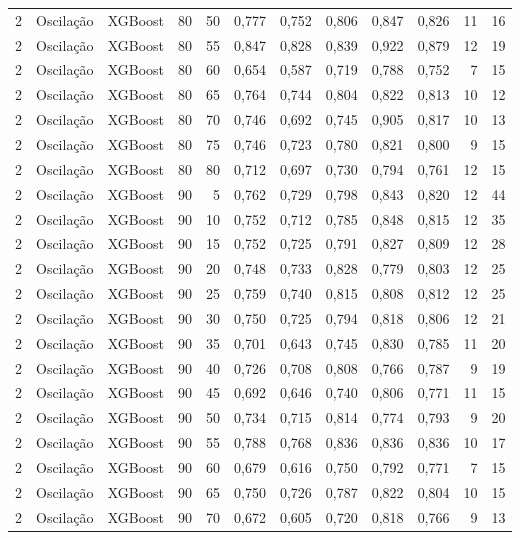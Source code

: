 \begin{longtable}{@{}rllrrrrrrrrr@{}}
2 & Oscilação & XGBoost & 80 & 50 & 0,777 & 0,752 & 0,806 & 0,847 & 0,826 & 11 & 16 \\
2 & Oscilação & XGBoost & 80 & 55 & 0,847 & 0,828 & 0,839 & 0,922 & 0,879 & 12 & 19 \\
2 & Oscilação & XGBoost & 80 & 60 & 0,654 & 0,587 & 0,719 & 0,788 & 0,752 & 7 & 15 \\
2 & Oscilação & XGBoost & 80 & 65 & 0,764 & 0,744 & 0,804 & 0,822 & 0,813 & 10 & 12 \\
2 & Oscilação & XGBoost & 80 & 70 & 0,746 & 0,692 & 0,745 & 0,905 & 0,817 & 10 & 13 \\
2 & Oscilação & XGBoost & 80 & 75 & 0,746 & 0,723 & 0,780 & 0,821 & 0,800 & 9 & 15 \\
2 & Oscilação & XGBoost & 80 & 80 & 0,712 & 0,697 & 0,730 & 0,794 & 0,761 & 12 & 15 \\
2 & Oscilação & XGBoost & 90 & 5 & 0,762 & 0,729 & 0,798 & 0,843 & 0,820 & 12 & 44 \\
2 & Oscilação & XGBoost & 90 & 10 & 0,752 & 0,712 & 0,785 & 0,848 & 0,815 & 12 & 35 \\
2 & Oscilação & XGBoost & 90 & 15 & 0,752 & 0,725 & 0,791 & 0,827 & 0,809 & 12 & 28 \\
2 & Oscilação & XGBoost & 90 & 20 & 0,748 & 0,733 & 0,828 & 0,779 & 0,803 & 12 & 25 \\
2 & Oscilação & XGBoost & 90 & 25 & 0,759 & 0,740 & 0,815 & 0,808 & 0,812 & 12 & 25 \\
2 & Oscilação & XGBoost & 90 & 30 & 0,750 & 0,725 & 0,794 & 0,818 & 0,806 & 12 & 21 \\
2 & Oscilação & XGBoost & 90 & 35 & 0,701 & 0,643 & 0,745 & 0,830 & 0,785 & 11 & 20 \\
2 & Oscilação & XGBoost & 90 & 40 & 0,726 & 0,708 & 0,808 & 0,766 & 0,787 & 9 & 19 \\
2 & Oscilação & XGBoost & 90 & 45 & 0,692 & 0,646 & 0,740 & 0,806 & 0,771 & 11 & 15 \\
2 & Oscilação & XGBoost & 90 & 50 & 0,734 & 0,715 & 0,814 & 0,774 & 0,793 & 9 & 20 \\
2 & Oscilação & XGBoost & 90 & 55 & 0,788 & 0,768 & 0,836 & 0,836 & 0,836 & 10 & 17 \\
2 & Oscilação & XGBoost & 90 & 60 & 0,679 & 0,616 & 0,750 & 0,792 & 0,771 & 7 & 15 \\
2 & Oscilação & XGBoost & 90 & 65 & 0,750 & 0,726 & 0,787 & 0,822 & 0,804 & 10 & 15 \\
2 & Oscilação & XGBoost & 90 & 70 & 0,672 & 0,605 & 0,720 & 0,818 & 0,766 & 9 & 13 \\

\end{longtable}
